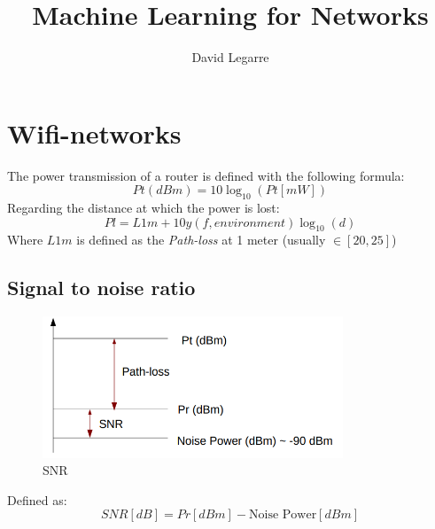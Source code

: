 \documentclass[12pt, a4paper]{report}
\title{Machine Learning for Networks}
\author{David Legarre}
\begin{document}
\maketitle
\chapter{Wifi-networks}
The power transmission of a router is defined with the following formula:
\begin{equation}
   Pt(dBm)=10\log_{10}(Pt[mW])
\end{equation}
Regarding the distance at which the power is lost:
\begin{equation}
   Pl=L1m+10y(f,environment)\log_{10}(d)
\end{equation}
Where $L1m$ is defined as the \textit{Path-loss} at 1 meter (usually $\in\left[ 20,25 \right]$)
\section{Signal to noise ratio}
\begin{figure}[htbp]
   \centering
   \includegraphics[width=0.8\textwidth]{SNR.png}
   \caption{SNR}
   \label{SNR}
\end{figure}
Defined as:
\begin{equation}
   SNR[dB]=Pr[dBm]-\text{Noise Power}[dBm]
\end{equation}
\end{document}

